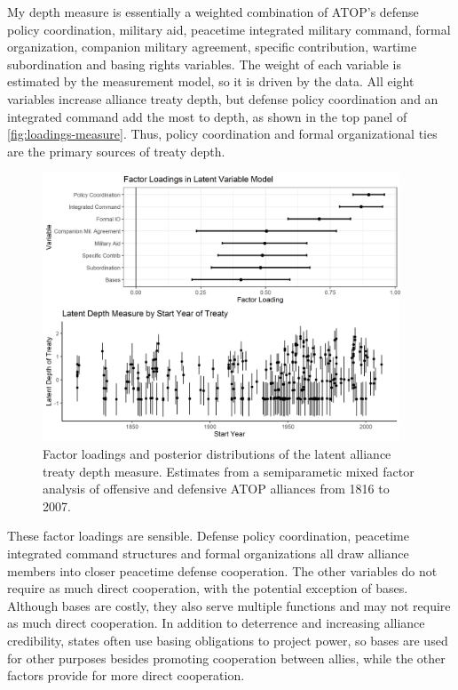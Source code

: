\documentclass[12pt]{article}
\begin{document}
My depth measure is essentially a weighted combination of ATOP's defense policy coordination, military aid, peacetime integrated military command, formal organization, companion military agreement, specific contribution, wartime subordination and basing rights variables.
The weight of each variable is estimated by the measurement model, so it is driven by the data.  
All eight variables increase alliance treaty depth, but defense policy coordination and an integrated command add the most to depth, as shown in the top panel of \autoref{fig:loadings-measure}. 
Thus, policy coordination and formal organizational ties are the primary sources of treaty depth. 


\begin{figure}[hbtp]
\centering
\includegraphics[width=0.95\textwidth]{../figures/loadings-measure.png}
\caption{Factor loadings and posterior distributions of the latent alliance treaty depth measure. Estimates from a semiparametic mixed factor analysis of offensive and defensive ATOP alliances from 1816 to 2007.}
\label{fig:loadings-measure}
\end{figure}


These factor loadings are sensible. 
Defense policy coordination, peacetime integrated command structures and formal organizations all draw alliance members into closer peacetime defense cooperation. 
The other variables do not require as much direct cooperation, with the potential exception of bases.
Although bases are costly, they also serve multiple functions and may not require as much direct cooperation. 
In addition to deterrence and increasing alliance credibility, states often use basing obligations to project power, so bases are used for other purposes besides promoting cooperation between allies, while the other factors provide for more direct cooperation.  
\end{document}
